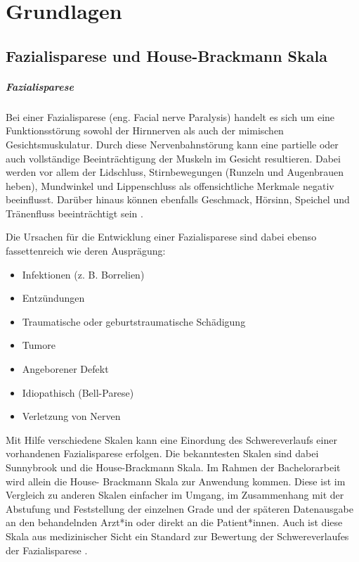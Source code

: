 \chapter{Grundlagen}\label{basics}
\section{Fazialisparese und House-Brackmann Skala}\label{facialpalsy}
\paragraph{Fazialisparese} Bei einer Fazialisparese (eng. Facial nerve Paralysis) handelt es sich um eine Funktionsstörung sowohl der Hirnnerven als auch der mimischen Gesichtsmuskulatur. Durch diese Nervenbahnstörung kann eine partielle oder auch vollständige Beeinträchtigung der Muskeln im Gesicht resultieren. Dabei werden vor allem der Lidschluss, Stirnbewegungen (Runzeln und Augenbrauen heben), Mundwinkel und Lippenschluss als offensichtliche Merkmale negativ beeinflusst. Darüber hinaus können ebenfalls Geschmack, Hörsinn, Speichel und Tränenfluss  beeinträchtigt sein \cite{facialpalsy_1}\cite{facialpalsy_2}.

Die Ursachen für die Entwicklung einer Fazialisparese sind dabei ebenso fassettenreich wie deren Ausprägung:
\begin{itemize}
  \setlength\itemsep{-0.5em}
\item Infektionen (z. B. Borrelien)
\item Entzündungen
\item Traumatische oder geburtstraumatische
Schädigung
\item Tumore
\item Angeborener Defekt
\item Idiopathisch (Bell-Parese)
\item Verletzung von Nerven
\end{itemize}

Mit Hilfe verschiedene Skalen kann eine Einordung des Schwereverlaufs einer vorhandenen Fazialisparese erfolgen. Die bekanntesten Skalen sind dabei Sunnybrook und die House-Brackmann Skala. Im Rahmen der Bachelorarbeit wird allein die House- Brackmann Skala zur Anwendung kommen. Diese ist im Vergleich zu anderen Skalen einfacher im Umgang, im Zusammenhang mit der Abstufung und Feststellung der einzelnen Grade und der späteren Datenausgabe an den behandelnden Arzt*in oder direkt an die Patient*innen. Auch ist diese Skala aus medizinischer Sicht ein Standard zur Bewertung der Schwereverlaufes der Fazialisparese \cite{Mothes2019}.





